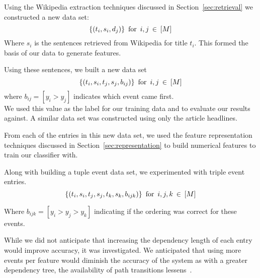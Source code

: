 \documentclass[bsc,frontabs,twoside,singlespacing,parskip,deptreport]{infthesis}     %
\begin{document}
    Using the Wikipedia extraction techniques discussed in Section~\ref{sec:retrieval} we constructed a new data set:
    \begin{equation}
      \{(t_{i},s_{i},d_{j})\} \hspace{0.5em} \text{for} \hspace{0.5em}i,j  \hspace{0.2em}\in \hspace{0.2em}[M]\nonumber
    \end{equation}
    Where $s_i$ is the sentences retrieved from Wikipedia for title $t_i$. 
    This formed the basis of our data to generate features.

    Using these sentences, we built a new data set
    \begin{equation}
      \{(t_{i},s_{i},t_{j},s_{j},b_{ij})\} \hspace{0.5em} \text{for} \hspace{0.5em} i,j \hspace{0.2em}\in \hspace{0.2em}[M]\nonumber
    \end{equation}
    where $b_{ij} = [y_{i} > y_{j}]$ indicates which event came first.\\
    We used this value as the label for our training data and to evaluate our results against.
    A similar data set was constructed using only the article headlines.
    
    From each of the entries in this new data set, we used the feature representation techniques discussed in Section~\ref{sec:representation} to build numerical
    features to train our classifier with.

Along with building a tuple event data set, we experimented with triple event entries.
\begin{equation}
      \{(t_{i},s_{i},t_{j},s_{j},t_{k},s_{k},b_{ijk})\} \hspace{0.5em} \text{for} \hspace{0.5em} i,j,k \hspace{0.2em}\in \hspace{0.2em}[M]\nonumber
\end{equation}

Where $b_{ijk} = [y_i > y_j > y_k]$ indicating if the ordering was correct for these events.

While we did not anticipate that increasing the dependency length of each entry would improve accuracy, it was investigated.
We anticipated that using more events per feature would diminish the accuracy of the system as
with a greater dependency tree, the availability of path transitions lessens~\cite{gerdes2013computational}.
\end{document}
